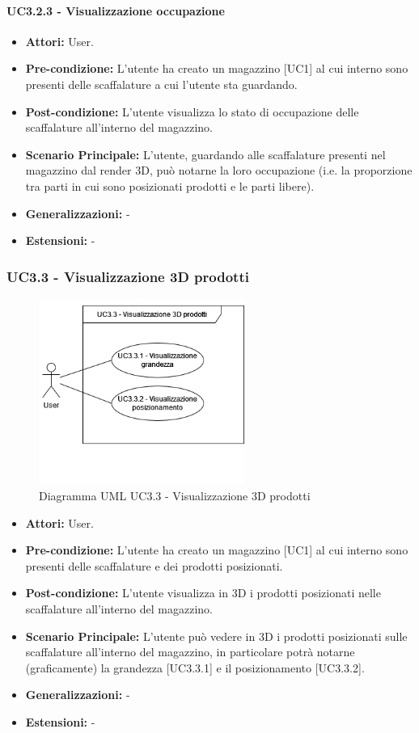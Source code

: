 \paragraph{UC3.2.3 - Visualizzazione occupazione}
\begin{itemize}
    \item \textbf{Attori:} User.
    \item \textbf{Pre-condizione:} L'utente ha creato un magazzino [UC1] al cui interno sono presenti delle scaffalature a cui l'utente sta guardando.
    \item \textbf{Post-condizione:} L'utente visualizza lo stato di occupazione delle scaffalature all'interno del magazzino.
    \item \textbf{Scenario Principale:}  L'utente, guardando alle scaffalature presenti nel magazzino dal render 3D, può notarne la loro occupazione (i.e. la proporzione tra parti in cui sono posizionati prodotti e le parti libere).
    \item \textbf{Generalizzazioni:} -
    \item \textbf{Estensioni:} -
\end{itemize}


\subsubsection{UC3.3 - Visualizzazione 3D prodotti}
\begin{figure}[H]
  \centering
  \includegraphics[width=0.6\textwidth]{UC_diagrams_1-10/UC3.3.drawio.png}
   \caption{Diagramma UML UC3.3 - Visualizzazione 3D prodotti}
\end{figure}
\begin{itemize}
    \item \textbf{Attori:} User.
    \item \textbf{Pre-condizione:}  L'utente ha creato un magazzino [UC1] al cui interno sono presenti delle scaffalature e dei prodotti posizionati.
    \item \textbf{Post-condizione:} L'utente visualizza in 3D i prodotti posizionati nelle scaffalature all'interno del magazzino.
    \item \textbf{Scenario Principale:}  L'utente può vedere in 3D i prodotti posizionati sulle scaffalature all'interno del magazzino, in particolare potrà notarne (graficamente) la grandezza [UC3.3.1] e il posizionamento [UC3.3.2].
    \item \textbf{Generalizzazioni:} -
    \item \textbf{Estensioni:} -
\end{itemize}


